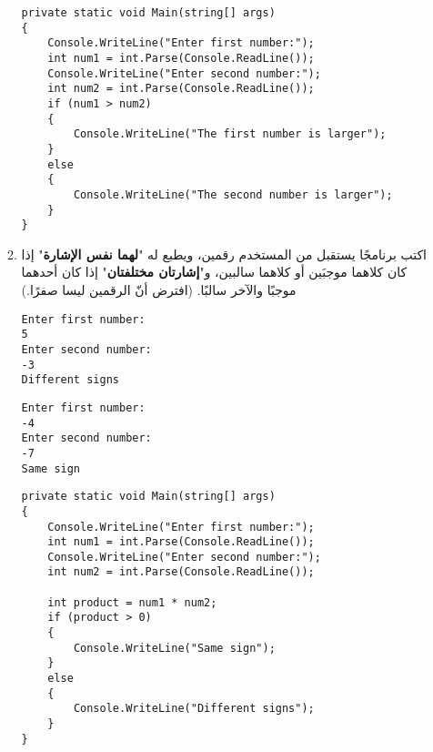 \documentclass[12pt]{article}
\begin{document}
\begin{enumerate}[itemsep=3em]
\begin{enumerate}
\ifwithsols
\begin{solution}
\begin{english}
\begin{lstlisting}
private static void Main(string[] args)
{
    Console.WriteLine("Enter first number:");
    int num1 = int.Parse(Console.ReadLine());
    Console.WriteLine("Enter second number:");
    int num2 = int.Parse(Console.ReadLine());
    if (num1 > num2)
    {
        Console.WriteLine("The first number is larger");
    }
    else
    {
        Console.WriteLine("The second number is larger");
    }
}
\end{lstlisting}
\end{english}
\end{solution}
\clearpage
\fi
\fi

\item
اكتب برنامجًا يستقبل من المستخدم رقمين، ويطبع له "\textbf{لهما نفس الإشارة}" إذا كان كلاهما موجبَين أو كلاهما سالبين، و"\textbf{إشارتان مختلفتان}" إذا كان أحدهما موجبًا والآخر سالبًا.
(افترض أنّ الرقمين ليسا صفرًا.)
\ifdetailed
\begin{example}[1]
\begin{english}
\begin{lstlisting}
Enter first number:
5
Enter second number:
-3
Different signs
\end{lstlisting}
\end{english}
\end{example}
\begin{example}[2]
\begin{english}
\begin{lstlisting}
Enter first number:
-4
Enter second number:
-7
Same sign
\end{lstlisting}
\end{english}
\end{example}

\ifwithsols
\begin{solution}
\begin{english}
\begin{lstlisting}
private static void Main(string[] args)
{
    Console.WriteLine("Enter first number:");
    int num1 = int.Parse(Console.ReadLine());
    Console.WriteLine("Enter second number:");
    int num2 = int.Parse(Console.ReadLine());

    int product = num1 * num2;
    if (product > 0)
    {
        Console.WriteLine("Same sign");
    }
    else
    {
        Console.WriteLine("Different signs");
    }
}
\end{lstlisting}
\end{english}
\end{solution}
\clearpage
\fi
\fi


\end{enumerate}
\end{enumerate}
\end{document}
